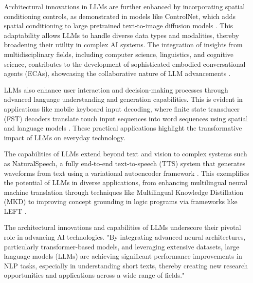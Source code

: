 Architectural innovations in LLMs are further enhanced by incorporating spatial conditioning controls, as demonstrated in models like ControlNet, which adds spatial conditioning to large pretrained text-to-image diffusion models . This adaptability allows LLMs to handle diverse data types and modalities, thereby broadening their utility in complex AI systems. The integration of insights from multidisciplinary fields, including computer science, linguistics, and cognitive science, contributes to the development of sophisticated embodied conversational agents (ECAs), showcasing the collaborative nature of LLM advancements \cite{korre2023takesvillagemultidisciplinaritycollaboration}.



LLMs also enhance user interaction and decision-making processes through advanced language understanding and generation capabilities. This is evident in applications like mobile keyboard input decoding, where finite state transducer (FST) decoders translate touch input sequences into word sequences using spatial and language models \cite{busetto2023metalearningmodelreferencedatadrivencontrol}. These practical applications highlight the transformative impact of LLMs on everyday technology.



The capabilities of LLMs extend beyond text and vision to complex systems such as NaturalSpeech, a fully end-to-end text-to-speech (TTS) system that generates waveforms from text using a variational autoencoder framework \cite{touvron2023llama}. This exemplifies the potential of LLMs in diverse applications, from enhancing multilingual neural machine translation through techniques like Multilingual Knowledge Distillation (MKD) \cite{zhao2022lifelonglearningmultilingualneural} to improving concept grounding in logic programs via frameworks like LEFT \cite{hsu2023whatsleftconceptgrounding}.



The architectural innovations and capabilities of LLMs underscore their pivotal role in advancing AI technologies. "By integrating advanced neural architectures, particularly transformer-based models, and leveraging extensive datasets, large language models (LLMs) are achieving significant performance improvements in NLP tasks, especially in understanding short texts, thereby creating new research opportunities and applications across a wide range of fields." \cite{ginzburg2021selfsuperviseddocumentsimilarityranking}



